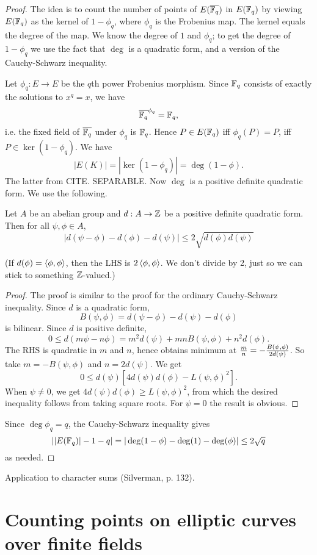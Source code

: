 \begin{proof}
The idea is to count the number of points of $E(\overline{\mathbb{F}_q})$ in $E(\mathbb{F}_q)$ by viewing $E(\mathbb{F}_q)$ as the kernel of $1-\phi_q$, where $\phi_q$ is the Frobenius map. The kernel equals the degree of the map. We know the degree of $1$ and $\phi_q$; to get the degree of $1-\phi_q$ we use the fact that $\deg$ is a quadratic form, and a version of the Cauchy-Schwarz inequality.

Let $\phi_q:E\to E$ be the $q$th power Frobenius morphism. 
Since $\mathbb{F}_q$ consists of exactly the solutions to $x^q=x$, we have
\[
\overline{\mathbb{F}_q}^{\phi_q}=\mathbb{F}_q,
\]
i.e. the fixed field of $\overline{\mathbb{F}_q}$ under $\phi_q$ is $\mathbb{F}_q$. Hence $P\in E(\mathbb{F}_q)$ iff $\phi_q(P)=P$, iff $P\in \ker(1-\phi_q)$. We have
\[
|E(K)|=|\ker(1-\phi_q)|=\deg(1-\phi).
\] 
The latter from CITE. SEPARABLE. Now $\deg$ is a positive definite quadratic form. We use the following.
\begin{lem}
Let $A$ be an abelian group and $d:A\to \mathbb{Z}$ be a positive definite quadratic form. Then for all $\psi,\phi\in A$,
\[
|d(\psi-\phi)-d(\phi)-d(\psi)|\le 2\sqrt{d(\phi)d(\psi)}
\]
\end{lem}
(If $d(\phi)=\left\langle {\phi,\phi}\right\rangle$, then the LHS is $2\left\langle {\phi,\phi}\right\rangle$. We don't divide by 2, just so we can stick to something $\mathbb{Z}$-valued.)
\begin{proof}
The proof is similar to the proof for the ordinary Cauchy-Schwarz inequality. Since $d$ is a quadratic form,
\[
B(\psi,\phi)=d(\psi-\phi)-d(\psi)-d(\phi)
\]
is bilinear. Since $d$ is positive definite,
\[
0\le d(m\psi-n\phi)=m^2d(\psi)+mnB(\psi,\phi)+n^2d(\phi).
\]
The RHS is quadratic in $m$ and $n$, hence obtains minimum at $\frac{m}{n}=-\frac{B(\psi,\phi)}{2d(\psi)}$. So take $m=-B(\psi,\phi)$ and $n=2d(\psi)$. We get 
\[
0\le d(\psi)[4d(\psi)d(\phi)-L(\psi,\phi)^2].
\]
When $\psi\ne 0$, we get $4d(\psi)d(\phi)\ge L(\psi,\phi)^2$, from which the desired inequality follows from taking square roots.
For $\psi=0$ the result is obvious.
\end{proof}
Since $\deg \phi_q=q$, the Cauchy-Schwarz inequality gives
\[
||E(\mathbb{F}_q)|-1-q|=| \deg(1-\phi)-\deg(1)-\deg(\phi)|\le 2\sqrt q
\]
as needed.
\end{proof}
Application to character sums (Silverman, p. 132).


\section{Counting points on elliptic curves over finite fields}

